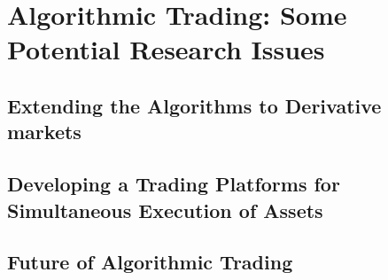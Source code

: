 
\chapter{Algorithmic Trading:  Some Potential Research Issues}\label{•}

\section{Extending the Algorithms to Derivative markets}
\section{Developing a Trading Platforms for Simultaneous Execution of Assets}
\section{Future of Algorithmic Trading}